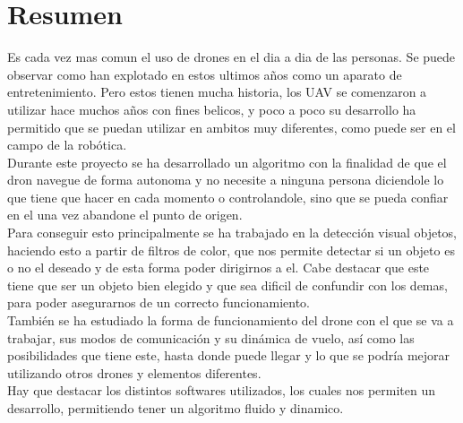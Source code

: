 \chapter*{Resumen}
\hspace{1cm} Es cada vez mas comun el uso de drones en el dia a dia de las personas. Se puede observar como han explotado en estos ultimos años como un aparato de entretenimiento. Pero estos tienen mucha historia, los UAV se comenzaron a utilizar hace muchos años con fines belicos, y poco a poco su desarrollo ha permitido que se puedan utilizar en ambitos muy diferentes, como puede ser en el campo de la rob\'otica. \\

\hspace{1cm} Durante este proyecto se ha desarrollado un algoritmo con la finalidad de que el dron navegue de forma autonoma y no necesite a ninguna persona diciendole lo que tiene que hacer en cada momento o controlandole, sino que se pueda confiar en el una vez abandone el punto de origen. \\

\hspace{1cm} Para conseguir esto principalmente se ha trabajado en la detecci\'on visual objetos, haciendo esto a partir de filtros de color, que nos permite detectar si un objeto es o no el deseado y de esta forma poder dirigirnos a el. Cabe destacar que este tiene que ser un objeto bien elegido y que sea dificil de confundir con los demas, para poder asegurarnos de un correcto funcionamiento. \\

\hspace{1cm} Tambi\'en se ha estudiado la forma de funcionamiento del drone con el que se va a trabajar, sus modos de comunicaci\'on y su din\'amica de vuelo, as\'i como las posibilidades que tiene este, hasta donde puede llegar y lo que se podr\'ia mejorar utilizando otros drones y elementos diferentes. \\

\hspace{1cm} Hay que destacar los distintos softwares utilizados, los cuales nos permiten un desarrollo, permitiendo tener un algoritmo fluido y dinamico. 

 

